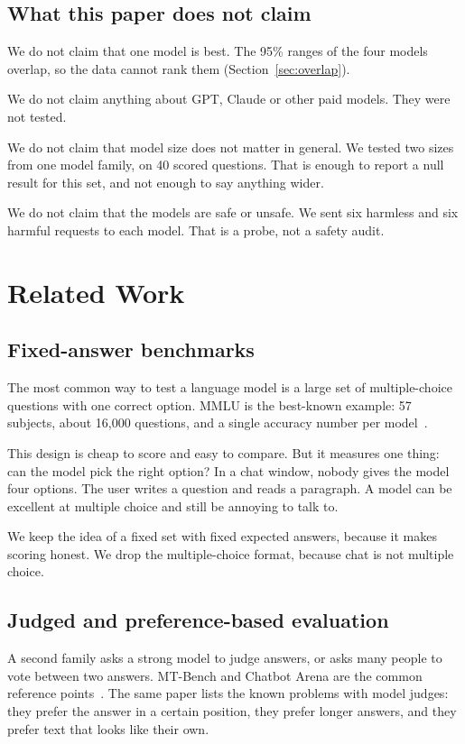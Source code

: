 \documentclass[11pt,a4paper]{article}
\begin{document}
\subsection{What this paper does not claim}

We do not claim that one model is best. The 95\% ranges of the four models overlap, so the data cannot rank them (Section~\ref{sec:overlap}).

We do not claim anything about GPT, Claude or other paid models. They were not tested.

We do not claim that model size does not matter in general. We tested two sizes from one model family, on 40 scored questions. That is enough to report a null result for this set, and not enough to say anything wider.

We do not claim that the models are safe or unsafe. We sent six harmless and six harmful requests to each model. That is a probe, not a safety audit.

\section{Related Work}

\subsection{Fixed-answer benchmarks}

The most common way to test a language model is a large set of multiple-choice questions with one correct option. MMLU is the best-known example: 57 subjects, about 16,000 questions, and a single accuracy number per model~\cite{hendrycks2021mmlu}.

This design is cheap to score and easy to compare. But it measures one thing: can the model pick the right option? In a chat window, nobody gives the model four options. The user writes a question and reads a paragraph. A model can be excellent at multiple choice and still be annoying to talk to.

We keep the idea of a fixed set with fixed expected answers, because it makes scoring honest. We drop the multiple-choice format, because chat is not multiple choice.

\subsection{Judged and preference-based evaluation}

A second family asks a strong model to judge answers, or asks many people to vote between two answers. MT-Bench and Chatbot Arena are the common reference points~\cite{zheng2023judge}. The same paper lists the known problems with model judges: they prefer the answer in a certain position, they prefer longer answers, and they prefer text that looks like their own.
\end{document}
